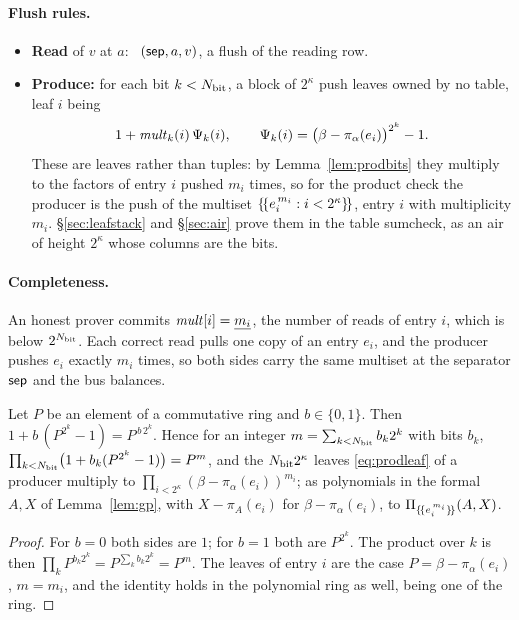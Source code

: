 \paragraph{Flush rules.}
\begin{itemize}
\item \textbf{Read} of $v$ at $a$: \pull\ $( \mathsf{sep},a,v )$, a flush of the reading row.
\item \textbf{Produce:} for each bit $k<N_{\mathrm{bit}}$, a block of $2^{\kappa}$ push leaves owned by no table, leaf $i$ being
\begin{equation}\label{eq:prodleaf}
  1+\mathit{mult}_{k}(i)\,\Psi_{k}(i),\qquad \Psi_{k}(i)=\bigl(\beta-\pi_\alpha(e_i)\bigr)^{2^{k}}-1 .
\end{equation}
These are leaves rather than tuples: by Lemma~\ref{lem:prodbits} they multiply to the factors of entry $i$ pushed $m_i$ times, so for the product check the producer is the push of the multiset $\{\!\{e_i^{\,m_i}:i<2^{\kappa}\}\!\}$, entry $i$ with multiplicity $m_i$. \S\ref{sec:leafstack} and \S\ref{sec:air} prove them in the table sumcheck, as an air of height $2^{\kappa}$ whose columns are the bits.
\end{itemize}

\paragraph{Completeness.} An honest prover commits $\mathit{mult}[i]=\underline{m_i}$, the number of reads of entry $i$, which is below $2^{N_{\mathrm{bit}}}$. Each correct read pulls one copy of an entry $e_i$, and the producer pushes $e_i$ exactly $m_i$ times, so both sides carry the same multiset at the separator $\mathsf{sep}$ and the bus balances.

\begin{lemma}\label{lem:prodbits}
Let $P$ be an element of a commutative ring and $b\in\{0,1\}$. Then $1+b\,(P^{2^{k}}-1)=P^{\,b\,2^{k}}$. Hence for an integer $m=\sum_{k<N_{\mathrm{bit}}}b_k2^{k}$ with bits $b_k$, $\prod_{k<N_{\mathrm{bit}}}\bigl(1+b_k(P^{2^{k}}-1)\bigr)=P^{m}$, and the $N_{\mathrm{bit}}2^{\kappa}$ leaves \eqref{eq:prodleaf} of a producer multiply to $\prod_{i<2^{\kappa}}(\beta-\pi_\alpha(e_i))^{m_i}$; as polynomials in the formal $A,X$ of Lemma~\ref{lem:gp}, with $X-\pi_A(e_i)$ for $\beta-\pi_\alpha(e_i)$, to $\Pi_{\{\!\{e_i^{\,m_i}\}\!\}}(A,X)$.
\end{lemma}

\begin{proof}
For $b=0$ both sides are $1$; for $b=1$ both are $P^{2^{k}}$. The product over $k$ is then $\prod_kP^{b_k2^{k}}=P^{\sum_kb_k2^{k}}=P^{m}$. The leaves of entry $i$ are the case $P=\beta-\pi_\alpha(e_i)$, $m=m_i$, and the identity holds in the polynomial ring as well, being one of the ring.
\end{proof}

